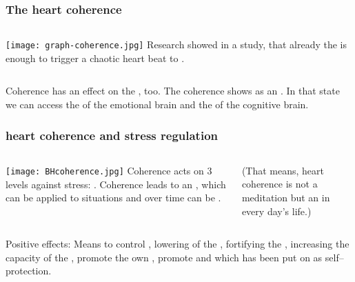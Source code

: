 \begin{frame}
\frametitle{The heart coherence}
\begin{columns}[c] %

\texttt{[image: graph-coherence.jpg]}
Research showed in a study, that already the  is enough to trigger a chaotic heart beat to . 
\end{columns}

\vspace{2mm}
Coherence has an effect on the , too. The coherence shows as an . In that state we can access the  of the emotional brain and the  of the cognitive brain.



\end{frame}
\begin{frame}
\frametitle{heart coherence and stress regulation}
\begin{columns}[c] %

\texttt{[image: BHcoherence.jpg]}
Coherence acts on 3 levels against stress: . Coherence leads to an , which can be applied to  situations and over time can be . 

(That means, heart coherence is not a meditation but an  in every day's life.)


\end{columns}

\vspace{4mm}

Positive effects: Means to control , lowering of the , fortifying the , 
increasing the capacity of the , promote the own , promote  and  which has been put on as self--protection.
\end{frame}
